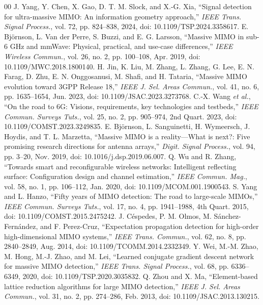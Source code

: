 \documentclass[conference]{IEEEtran}
\begin{document}
	\begin{thebibliography}{00}
		 J. Yang, Y. Chen, X. Gao, D. T. M. Slock, and X.-G. Xia, ``Signal detection for ultra-massive MIMO: An information geometry approach,'' \textit{IEEE Trans. Signal Process.}, vol. 72, pp. 824--838, 2024, doi: 10.1109/TSP.2024.3358617.
		 E. Bj\"ornson, L. Van der Perre, S. Buzzi, and E. G. Larsson, ``Massive MIMO in sub-6 GHz and mmWave: Physical, practical, and use-case differences,'' \textit{IEEE Wireless Commun.}, vol. 26, no. 2, pp. 100--108, Apr. 2019, doi: 10.1109/MWC.2018.1800140.
		 H. Jin, K. Liu, M. Zhang, L. Zhang, G. Lee, E. N. Farag, D. Zhu, E. N. Onggosanusi, M. Shafi, and H. Tataria, ``Massive MIMO evolution toward 3GPP Release 18,'' \textit{IEEE J. Sel. Areas Commun.}, vol. 41, no. 6, pp. 1635--1654, Jun. 2023, doi: 10.1109/JSAC.2023.3273768.
		 C.-X. Wang \textit{et al.}, ``On the road to 6G: Visions, requirements, key technologies and testbeds,'' \textit{IEEE Commun. Surveys Tuts.}, vol. 25, no. 2, pp. 905--974, 2nd Quart. 2023, doi: 10.1109/COMST.2023.3249835.
		 E. Bj\"ornson, L. Sanguinetti, H. Wymeersch, J. Hoydis, and T. L. Marzetta, ``Massive MIMO is a reality---What is next?: Five promising research directions for antenna arrays,'' \textit{Digit. Signal Process.}, vol. 94, pp. 3--20, Nov. 2019, doi: 10.1016/j.dsp.2019.06.007.
		 Q. Wu and R. Zhang, ``Towards smart and reconfigurable wireless networks: Intelligent reflecting surface: Configuration design and channel estimation,'' \textit{IEEE Commun. Mag.}, vol. 58, no. 1, pp. 106--112, Jan. 2020, doi: 10.1109/MCOM.001.1900543.
		 S. Yang and L. Hanzo, ``Fifty years of MIMO detection: The road to large-scale MIMOs,'' \textit{IEEE Commun. Surveys Tuts.}, vol. 17, no. 4, pp. 1941--1988, 4th Quart. 2015, doi: 10.1109/COMST.2015.2475242.
		 J. C\'espedes, P. M. Olmos, M. S\'anchez-Fern\'andez, and F. Perez-Cruz, ``Expectation propagation detection for high-order high-dimensional MIMO systems,'' \textit{IEEE Trans. Commun.}, vol. 62, no. 8, pp. 2840--2849, Aug. 2014, doi: 10.1109/TCOMM.2014.2332349.
		 Y. Wei, M.-M. Zhao, M. Hong, M.-J. Zhao, and M. Lei, ``Learned conjugate gradient descent network for massive MIMO detection,'' \textit{IEEE Trans. Signal Process.}, vol. 68, pp. 6336--6349, 2020, doi: 10.1109/TSP.2020.3035832.
		 Q. Zhou and X. Ma, ``Element-based lattice reduction algorithms for large MIMO detection,'' \textit{IEEE J. Sel. Areas Commun.}, vol. 31, no. 2, pp. 274--286, Feb. 2013, doi: 10.1109/JSAC.2013.130215.

\end{thebibliography}
\end{document}
